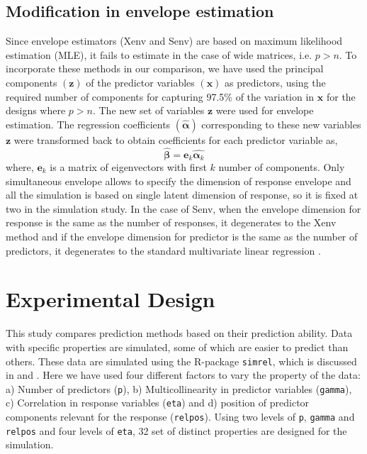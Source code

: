 \documentclass[review]{elsarticle}
\begin{document}
\subsection{Modification in envelope
estimation}\label{modification-in-envelope-estimation}

Since envelope estimators (Xenv and Senv) are based on maximum
likelihood estimation (MLE), it fails to estimate in the case of wide
matrices, i.e. \(p > n\). To incorporate these methods in our
comparison, we have used the principal components \((\mathbf{z})\) of
the predictor variables \((\mathbf{x})\) as predictors, using the
required number of components for capturing 97.5\% of the variation in
\(\mathbf{x}\) for the designs where \(p > n\). The new set of variables
\(\mathbf{z}\) were used for envelope estimation. The regression
coefficients \((\hat{\boldsymbol{\alpha}})\) corresponding to these new
variables \(\mathbf{z}\) were transformed back to obtain coefficients
for each predictor variable as,
\[\hat{\boldsymbol{\beta}} = \mathbf{e}_k\hat{\boldsymbol{\alpha}_k}\]
where, \(\mathbf{e}_k\) is a matrix of eigenvectors with first \(k\)
number of components. Only simultaneous envelope allows to specify the
dimension of response envelope and all the simulation is based on single
latent dimension of response, so it is fixed at two in the simulation
study. In the case of Senv, when the envelope dimension for response is
the same as the number of responses, it degenerates to the Xenv method
and if the envelope dimension for predictor is the same as the number of
predictors, it degenerates to the standard multivariate linear
regression \citep{env2018}.

\hypertarget{experimental-design}{\section{Experimental
Design}\label{experimental-design}}

This study compares prediction methods based on their prediction
ability. Data with specific properties are simulated, some of which are
easier to predict than others. These data are simulated using the
R-package \texttt{simrel}, which is discussed in \citet{saebo2015simrel}
and \citet{Rimal2018}. Here we have used four different factors to vary
the property of the data: a) Number of predictors (\texttt{p}), b)
Multicollinearity in predictor variables (\texttt{gamma}), c)
Correlation in response variables (\texttt{eta}) and d) position of
predictor components relevant for the response (\texttt{relpos}). Using
two levels of \texttt{p}, \texttt{gamma} and \texttt{relpos} and four
levels of \texttt{eta}, 32 set of distinct properties are designed for
the simulation.
\end{document}
